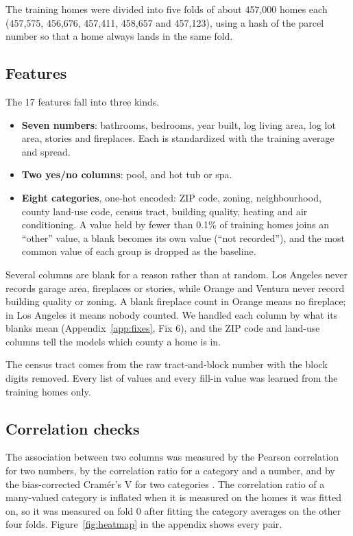 \documentclass[sigconf,nonacm,10pt]{acmart}
\begin{document}
The training homes were divided into five folds of about 457,000 homes each (457,575, 456,676, 457,411, 458,657 and 457,123), using a hash of the parcel number so that a home always lands in the same fold.

\subsection{Features}
The 17 features fall into three kinds.
\begin{itemize}
\item \textbf{Seven numbers}: bathrooms, bedrooms, year built, log living area, log lot area, stories and fireplaces. Each is standardized with the training average and spread.
\item \textbf{Two yes/no columns}: pool, and hot tub or spa.
\item \textbf{Eight categories}, one-hot encoded: ZIP code, zoning, neighbourhood, county land-use code, census tract, building quality, heating and air conditioning. A value held by fewer than 0.1\% of training homes joins an ``other'' value, a blank becomes its own value (``not recorded''), and the most common value of each group is dropped as the baseline.
\end{itemize}

Several columns are blank for a reason rather than at random. Los Angeles never records garage area, fireplaces or stories, while Orange and Ventura never record building quality or zoning. A blank fireplace count in Orange means no fireplace; in Los Angeles it means nobody counted. We handled each column by what its blanks mean (Appendix~\ref{app:fixes}, Fix 6), and the ZIP code and land-use columns tell the models which county a home is in.

The census tract comes from the raw tract-and-block number with the block digits removed. Every list of values and every fill-in value was learned from the training homes only.

\subsection{Correlation checks}
\label{sec:checks}
The association between two columns was measured by the Pearson correlation for two numbers, by the correlation ratio for a category and a number, and by the bias-corrected Cram\'er's V for two categories \cite{cramer1946,bergsma2013}. The correlation ratio of a many-valued category is inflated when it is measured on the homes it was fitted on, so it was measured on fold 0 after fitting the category averages on the other four folds. Figure~\ref{fig:heatmap} in the appendix shows every pair.
\end{document}
